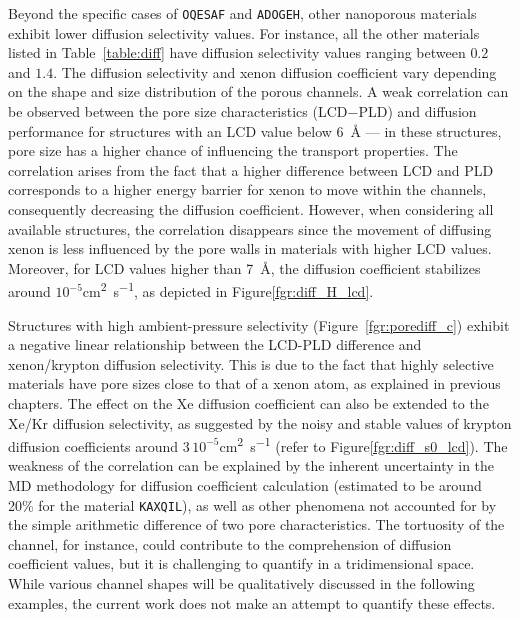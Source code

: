 \documentclass[main]{subfiles}
\begin{document}
Beyond the specific cases of \texttt{OQESAF} and \texttt{ADOGEH}, other nanoporous materials exhibit lower diffusion selectivity values. For instance, all the other materials listed in Table~\ref{table:diff} have diffusion selectivity values ranging between $0.2$ and $1.4$. The diffusion selectivity and xenon diffusion coefficient vary depending on the shape and size distribution of the porous channels. A weak correlation can be observed between the pore size characteristics (LCD$-$PLD) and diffusion performance for structures with an LCD value below \SI{6}{\angstrom} --- in these structures, pore size has a higher chance of influencing the transport properties. The correlation arises from the fact that a higher difference between LCD and PLD corresponds to a higher energy barrier for xenon to move within the channels, consequently decreasing the diffusion coefficient. However, when considering all available structures, the correlation disappears since the movement of diffusing xenon is less influenced by the pore walls in materials with higher LCD values. Moreover, for LCD values higher than \SI{7}{\angstrom}, the diffusion coefficient stabilizes around $10^{-5}$\si{\square\cm\per\s}, as depicted in Figure\ref{fgr:diff_H_lcd}. 

Structures with high ambient-pressure selectivity (Figure~\ref{fgr:porediff_c}) exhibit a negative linear relationship between the LCD-PLD difference and xenon/krypton diffusion selectivity. This is due to the fact that highly selective materials have pore sizes close to that of a xenon atom, as explained in previous chapters. The effect on the Xe diffusion coefficient can also be extended to the Xe/Kr diffusion selectivity, as suggested by the noisy and stable values of krypton diffusion coefficients around $3\,10^{-5}$\si{\square\cm\per\s} (refer to Figure\ref{fgr:diff_s0_lcd}). The weakness of the correlation can be explained by the inherent uncertainty in the MD methodology for diffusion coefficient calculation (estimated to be around {20\%} for the material \texttt{KAXQIL}), as well as other phenomena not accounted for by the simple arithmetic difference of two pore characteristics. The tortuosity of the channel, for instance, could contribute to the comprehension of diffusion coefficient values, but it is challenging to quantify in a tridimensional space. While various channel shapes will be qualitatively discussed in the following examples, the current work does not make an attempt to quantify these effects.
\end{document}
